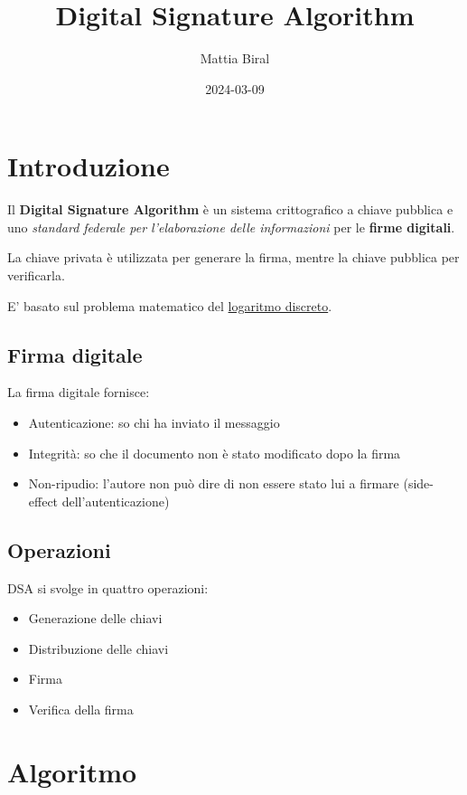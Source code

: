 \documentclass[14pt]{extarticle}
\title{Digital Signature Algorithm}
\date{2024-03-09}
\author{Mattia Biral}
\begin{document}
    \maketitle
    \newpage
    \sffamily

    \section{Introduzione}

    Il \textbf{Digital Signature Algorithm} è un sistema crittografico a chiave pubblica e uno \emph{standard federale per l'elaborazione delle informazioni} per le \textbf{firme digitali}.
    
    La chiave privata è utilizzata per generare la firma, mentre la chiave pubblica per verificarla.

    E' basato sul problema matematico del \underline{logaritmo discreto}.

    \subsection{Firma digitale}

    La firma digitale fornisce:
    \begin{itemize}
        \item Autenticazione: so chi ha inviato il messaggio
        \item Integrità: so che il documento non è stato modificato dopo la firma
        \item Non-ripudio: l'autore non può dire di non essere stato lui a firmare (side-effect dell'autenticazione)
    \end{itemize}

    \subsection{Operazioni}

    DSA si svolge in quattro operazioni:
    \begin{itemize}
        \item Generazione delle chiavi
        \item Distribuzione delle chiavi
        \item Firma
        \item Verifica della firma
    \end{itemize}

    \section{Algoritmo}
\end{document}
